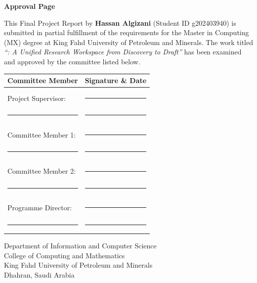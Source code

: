 \thispagestyle{empty}
\begin{center}
\vspace*{1cm}
{\Large\bfseries Approval Page\par}
\vspace{1cm}
\end{center}

\noindent
This Final Project Report by \textbf{Hassan Algizani} (Student ID g202403940) is submitted in partial fulfillment of the requirements for the Master in Computing (MX) degree at King Fahd University of Petroleum and Minerals. The work titled \textit{``\sh{}: A Unified Research Workspace from Discovery to Draft''} has been examined and approved by the committee listed below.

\vspace{2cm}

\begin{center}
\begin{tabular}{@{}p{}p{}@{}}
\toprule
\textbf{Committee Member} & \textbf{Signature \& Date} \\
\midrule
\\[0.4cm]
Project Supervisor: & \rule{6cm}{0.4pt} \\
\hspace{1em}\rule{5cm}{0.4pt} & \rule{6cm}{0.4pt} \\
\\[0.6cm]
Committee Member 1: & \rule{6cm}{0.4pt} \\
\hspace{1em}\rule{5cm}{0.4pt} & \rule{6cm}{0.4pt} \\
\\[0.6cm]
Committee Member 2: & \rule{6cm}{0.4pt} \\
\hspace{1em}\rule{5cm}{0.4pt} & \rule{6cm}{0.4pt} \\
\\[0.6cm]
Programme Director: & \rule{6cm}{0.4pt} \\
\hspace{1em}\rule{5cm}{0.4pt} & \rule{6cm}{0.4pt} \\
\bottomrule
\end{tabular}
\end{center}

\vfill

\begin{center}
{\small Department of Information and Computer Science \\ College of Computing and Mathematics \\ King Fahd University of Petroleum and Minerals \\ Dhahran, Saudi Arabia}
\end{center}

\clearpage
